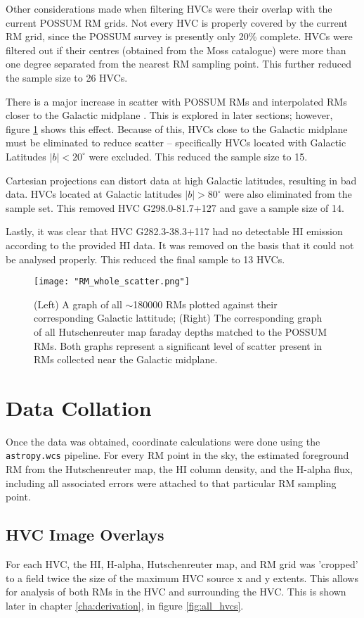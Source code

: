 Other considerations made when filtering HVCs were their overlap with the current POSSUM RM grids. Not every HVC is properly covered by the current RM grid, since the POSSUM survey is presently only 20\% complete. HVCs were filtered out if their centres (obtained from the Moss catalogue) were more than one degree separated from the nearest RM sampling point. This further reduced the sample size to 26 HVCs.


There is a major increase in scatter with POSSUM RMs and interpolated RMs closer to the Galactic midplane \citep{ID21}. This is explored in later sections; however, figure \ref{fig:rm_scatter} shows this effect. Because of this, HVCs close to the Galactic midplane must be eliminated to reduce scatter – specifically HVCs located with Galactic Latitudes $|b|<20^{\circ}$ were excluded. This reduced the sample size to 15.


Cartesian projections can distort data at high Galactic latitudes, resulting in bad data. HVCs located at Galactic latitudes $|b|>80^{\circ}$ were also eliminated from the sample set. This removed HVC G298.0-81.7+127 and gave a sample size of 14.


Lastly, it was clear that HVC G282.3-38.3+117 had no detectable HI emission according to the provided HI data. It was removed on the basis that it could not be analysed properly. This reduced the final sample to 13 HVCs.

\begin{figure}
    \texttt{[image: "RM\_whole\_scatter.png"]}
    \centering
    \caption{(Left) A graph of all $\sim$180000 RMs plotted against their corresponding Galactic lattitude; (Right) The corresponding graph of all Hutschenreuter map faraday depths matched to the POSSUM RMs. Both graphs represent a significant level of scatter present in RMs collected near the Galactic midplane.}
    \label{fig:rm_scatter}
\end{figure}

\section{Data Collation}
\label{sec:collation}

Once the data was obtained, coordinate calculations were done using the \verb|astropy.wcs| pipeline. For every RM point in the sky, the estimated foreground RM from the Hutschenreuter map, the HI column density, and the H-alpha flux, including all associated errors were attached to that particular RM sampling point.

\subsection{HVC Image Overlays}
\label{ssec:hvc_snapshot}

For each HVC, the HI, H-alpha, Hutschenreuter map, and RM grid was 'cropped' to a field twice the size of the maximum HVC source x and y extents. This allows for analysis of both RMs in the HVC and surrounding the HVC. This is shown later in chapter \ref{cha:derivation}, in figure \ref{fig:all_hvcs}.


